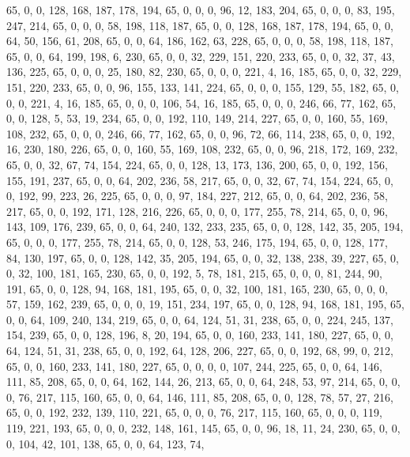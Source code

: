 \begin{DoxyCode}
       65, 0, 0, 128, 168, 187, 178, 194, 65, 0, 0, 0, 96, 12, 183, 204, 65, 0, 0, 0, 83, 195, 247, 214, 65, 0, 0, 0,
       58, 198, 118, 187, 65, 0, 0, 128, 168, 187, 178, 194, 65, 0, 0, 64, 50, 156, 61, 208, 65, 0, 0, 64, 186,
       162, 63, 228, 65, 0, 0, 0, 58, 198, 118, 187, 65, 0, 0, 64, 199, 198, 6, 230, 65, 0, 0, 32, 229, 151, 220,
       233, 65, 0, 0, 32, 37, 43, 136, 225, 65, 0, 0, 0, 25, 180, 82, 230, 65, 0, 0, 0, 221, 4, 16, 185, 65, 0, 0, 32,
       229, 151, 220, 233, 65, 0, 0, 96, 155, 133, 141, 224, 65, 0, 0, 0, 155, 129, 55, 182, 65, 0, 0, 0, 221, 4,
       16, 185, 65, 0, 0, 0, 106, 54, 16, 185, 65, 0, 0, 0, 246, 66, 77, 162, 65, 0, 0, 128, 5, 53, 19, 234, 65, 0,
       0, 192, 110, 149, 214, 227, 65, 0, 0, 160, 55, 169, 108, 232, 65, 0, 0, 0, 246, 66, 77, 162, 65, 0, 0, 96,
       72, 66, 114, 238, 65, 0, 0, 192, 16, 230, 180, 226, 65, 0, 0, 160, 55, 169, 108, 232, 65, 0, 0, 96, 218,
       172, 169, 232, 65, 0, 0, 32, 67, 74, 154, 224, 65, 0, 0, 128, 13, 173, 136, 200, 65, 0, 0, 192, 156, 155, 191,
       237, 65, 0, 0, 64, 202, 236, 58, 217, 65, 0, 0, 32, 67, 74, 154, 224, 65, 0, 0, 192, 99, 223, 26, 225, 65,
       0, 0, 0, 97, 184, 227, 212, 65, 0, 0, 64, 202, 236, 58, 217, 65, 0, 0, 192, 171, 128, 216, 226, 65, 0, 0, 0,
       177, 255, 78, 214, 65, 0, 0, 96, 143, 109, 176, 239, 65, 0, 0, 64, 240, 132, 233, 235, 65, 0, 0, 128, 142,
       35, 205, 194, 65, 0, 0, 0, 177, 255, 78, 214, 65, 0, 0, 128, 53, 246, 175, 194, 65, 0, 0, 128, 177, 84, 130,
       197, 65, 0, 0, 128, 142, 35, 205, 194, 65, 0, 0, 32, 138, 238, 39, 227, 65, 0, 0, 32, 100, 181, 165, 230,
       65, 0, 0, 192, 5, 78, 181, 215, 65, 0, 0, 0, 81, 244, 90, 191, 65, 0, 0, 128, 94, 168, 181, 195, 65, 0, 0, 32,
       100, 181, 165, 230, 65, 0, 0, 0, 57, 159, 162, 239, 65, 0, 0, 0, 19, 151, 234, 197, 65, 0, 0, 128, 94, 168,
       181, 195, 65, 0, 0, 64, 109, 240, 134, 219, 65, 0, 0, 64, 124, 51, 31, 238, 65, 0, 0, 224, 245, 137, 154,
       239, 65, 0, 0, 128, 196, 8, 20, 194, 65, 0, 0, 160, 233, 141, 180, 227, 65, 0, 0, 64, 124, 51, 31, 238, 65,
       0, 0, 192, 64, 128, 206, 227, 65, 0, 0, 192, 68, 99, 0, 212, 65, 0, 0, 160, 233, 141, 180, 227, 65, 0, 0, 0,
       0, 107, 244, 225, 65, 0, 0, 64, 146, 111, 85, 208, 65, 0, 0, 64, 162, 144, 26, 213, 65, 0, 0, 64, 248, 53,
       97, 214, 65, 0, 0, 0, 76, 217, 115, 160, 65, 0, 0, 64, 146, 111, 85, 208, 65, 0, 0, 128, 78, 57, 27, 216, 65,
       0, 0, 192, 232, 139, 110, 221, 65, 0, 0, 0, 76, 217, 115, 160, 65, 0, 0, 0, 119, 119, 221, 193, 65, 0, 0,
       0, 232, 148, 161, 145, 65, 0, 0, 96, 18, 11, 24, 230, 65, 0, 0, 0, 104, 42, 101, 138, 65, 0, 0, 64, 123, 74,

\end{DoxyCode}
